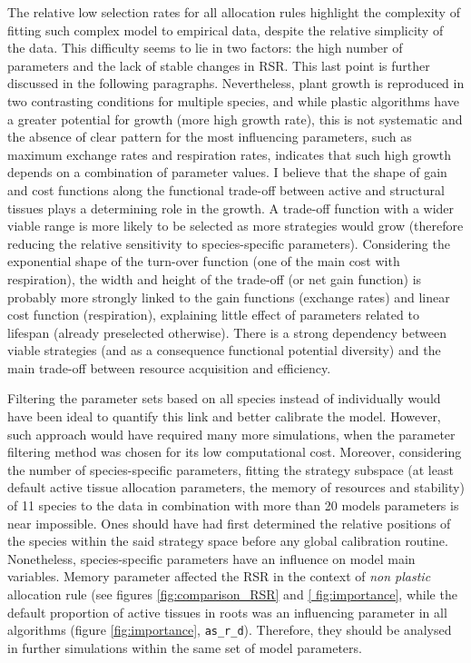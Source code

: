The relative low selection rates for all allocation rules highlight the complexity of fitting such complex model to empirical data, despite the relative simplicity of the data. This difficulty seems to lie in two factors: the high number of parameters and the lack of stable changes in RSR. This last point is further discussed in the following paragraphs. Nevertheless, plant growth is reproduced in two contrasting conditions for multiple species, and while plastic algorithms have a greater potential for growth (more high growth rate), this is not systematic and the absence of clear pattern for the most influencing parameters, such as maximum exchange rates and respiration rates, indicates that such high growth depends on a combination of parameter values. I believe that the shape of gain and cost functions along the functional trade-off between active and structural tissues plays a determining role in the growth. A trade-off function with a wider viable range is more likely to be selected as more strategies would grow (therefore reducing the relative sensitivity to species-specific parameters). Considering the exponential shape of the turn-over function (one of the main cost with respiration), the width and height of the trade-off (or net gain function) is probably more strongly linked to the gain functions (exchange rates) and linear cost function (respiration), explaining little effect of parameters related to lifespan (already preselected otherwise). There is a strong dependency between viable strategies (and as a consequence functional potential diversity) and the main trade-off between resource acquisition and efficiency.

Filtering the parameter sets based on all species instead of individually would have been ideal to quantify this link and better calibrate the model. However, such approach would have required many more simulations, when the parameter filtering method was chosen for its low computational cost. Moreover, considering the number of species-specific parameters, fitting the strategy subspace (at least default active tissue allocation parameters, the memory of resources and stability) of 11 species to the data in combination with more than 20 models parameters is near impossible. Ones should have had first determined the relative positions of the species within the said strategy space before any global calibration routine. Nonetheless, species-specific parameters have an influence on model main variables. Memory parameter affected the RSR in the context of \textit{non plastic} allocation rule (see figures \ref{fig:comparison_RSR} and \ref{ fig:importance}, while the default proportion of active tissues in roots was an influencing parameter in all algorithms (figure \ref{fig:importance}, \texttt{as\_r\_d}). Therefore, they should be analysed in further simulations within the same set of model parameters.

